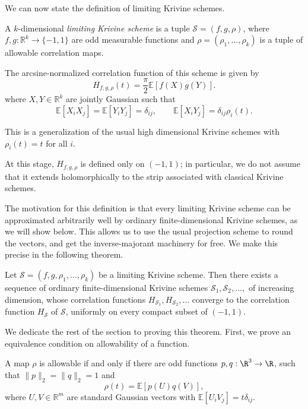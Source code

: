 We can now state the definition of limiting Krivine schemes. 

\begin{definition}
A $k$-dimensional \emph{limiting Krivine scheme} is a tuple $\mathcal{S} = (f, g, \rho)$, where  \(f,g:\mathbb{R}^k\to\{-1,1\}\) are odd measurable functions and \(\rho = (\rho_1,\ldots,\rho_k)\) is a tuple of allowable correlation maps.  

The arcsine-normalized correlation function of this scheme is given by 
\[
H_{f, g, \rho}(t)
=
\frac{\pi}{2}\mathbb{E}[f(X)g(Y)].
\]
where \(X,Y\in\mathbb{R}^k\) are jointly Gaussian such that
\[
\mathbb{E}[X_iX_j]
=
\mathbb{E}[Y_iY_j]
=
\delta_{ij},
\qquad
\mathbb{E}[X_iY_j]
=
\delta_{ij}\rho_i(t).
\]
\end{definition}

\begin{remark}
    This is a generalization of the usual high dimensional Krivine schemes with $\rho_i(t) = t$ for all $i$. 

    At this stage, \(H_{f, g, \rho}\) is defined only on \((-1,1)\); in particular, we do not assume that it extends holomorphically to the strip associated with classical Krivine schemes.
\end{remark}

The motivation for this definition is that every limiting Krivine scheme can be approximated arbitrarily well by ordinary finite-dimensional Krivine schemes, as we will show below. This allows us to use the usual projection scheme to round the vectors, and get the inverse-majorant machinery for free. We make this precise in the following theorem.  

\begin{theorem}
Let \(\mathcal S=(f,g,\rho_1,\ldots,\rho_k)\) be a limiting Krivine scheme. Then there exists a sequence of ordinary finite-dimensional Krivine schemes
\(
\mathcal S_1,\mathcal S_2,\ldots,
\)
of increasing dimension, whose correlation functions $H_{\mathcal S_1}, H_{\mathcal S_2}, \ldots$ converge to the correlation function $H_{\mathcal S}$ of \(\mathcal S\), uniformly on every compact subset of \((-1,1)\).
\end{theorem}

We dedicate the rest of the section to proving this theorem. First, we prove an equivalence condition on allowability of a function. 

\begin{lemma}
A map \(\rho\) is allowable if and only if there are odd functions
\(p,q: \R^3 \to \R\), such that
\(\|p\|_2=\|q\|_2=1\) and
\[
\rho(t)=\mathbb{E}[p(U)q(V)],
\]
where \(U,V\in\mathbb{R}^m\) are standard Gaussian vectors with
\(\mathbb{E}[U_iV_j]=t\delta_{ij}\).
\end{lemma}

